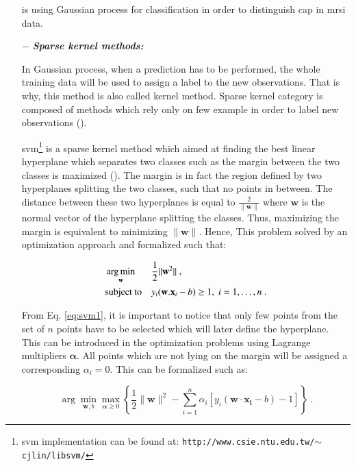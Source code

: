 \begin{enumerate}[leftmargin=*]
\cite{Kelm2007} is using Gaussian process for classification in order to distinguish \ac{cap} in \ac{mrsi} data.

\item[$-$] \textbf{\textit{Sparse kernel methods:}}

In Gaussian process, when a prediction has to be performed, the whole training data will be used to assign a label to the new observations. That is why, this method is also called kernel method. Sparse kernel category is composed of methods which rely only on few example in order to label new observations (\cite{Bishop2006}).

\Acf{svm}\footnote{\ac{svm} implementation can be found at: \texttt{http://www.csie.ntu.edu.tw/$\sim$cjlin/libsvm/}} is a sparse kernel method which aimed at finding the best linear hyperplane which separates two classes such as the margin between the two classes is maximized (\cite{Vapnik1963}). The margin is in fact the region defined by two hyperplanes splitting the two classes, such that no points in between. The distance between these two hyperplanes is equal to $\frac{2}{\|\mathbf{w}\|}$ where $\mathbf{w}$ is the normal vector of the hyperplane splitting the classes. Thus, maximizing the margin is equivalent to minimizing $\|\mathbf{w}\|$. Hence, This problem solved by an optimization approach and formalized such that:

\begin{equation}
\begin{aligned}
& \operatorname*{arg\,min}_{\mathbf{w}}
& & \frac{1}{2} \| \mathbf{w}^2\| \ , \\
& \text{subject to}
& & y_i(\mathbf{w}.\mathbf{x}_i - b) \geq 1, \; i = 1, \ldots, n \ .
\end{aligned}
\label{eq:svm1}
\end{equation}

From Eq. \eqref{eq:svm1}, it is important to notice that only few points from the set of $n$ points have to be selected which will later define the hyperplane. This can be introduced in the optimization problems using Lagrange multipliers $\boldsymbol{\alpha}$. All points which are not lying on the margin will be assigned a corresponding $\alpha_i = 0$. This can be formalized such as:

\begin{equation}
	\arg\min_{\mathbf{w},b } \max_{\boldsymbol{\alpha}\geq 0 } \left\{ \frac{1}{2}\|\mathbf{w}\|^2 - \sum_{i=1}^{n}{\alpha_i[y_i(\mathbf{w}\cdot \mathbf{x_i} - b)-1]} \right\} \ .
	\label{eq:svm2}
\end{equation}


\end{enumerate}
